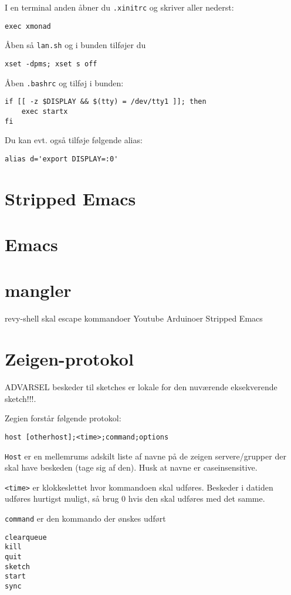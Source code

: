\documentclass[10pt,a4paper,danish]{article}
\begin{document}
I en terminal anden åbner du \texttt{.xinitrc} og skriver aller nederst:
\begin{verbatim}
exec xmonad
\end{verbatim}

Åben så \texttt{lan.sh} og i bunden tilføjer du
\begin{verbatim}
xset -dpms; xset s off
\end{verbatim}

Åben \texttt{.bashrc} og tilføj i bunden:
\begin{verbatim}
if [[ -z $DISPLAY && $(tty) = /dev/tty1 ]]; then
    exec startx
fi
\end{verbatim}
Du kan evt. også tilføje følgende alias:
\begin{verbatim}
alias d='export DISPLAY=:0'
\end{verbatim}

\section{Stripped Emacs}
\section{Emacs}
\section{mangler}
revy-shell skal escape kommandoer
Youtube
Arduinoer
Stripped Emacs

\section{Zeigen-protokol}

ADVARSEL beskeder til sketches er lokale for den nuværende eksekverende sketch!!!.

Zegien forstår følgende protokol:

\begin{verbatim}
host [otherhost];<time>;command;options
\end{verbatim}

\texttt{Host} er en mellemrums adskilt liste af navne på de zeigen servere/grupper der
skal have beskeden (tage sig af den). Husk at navne er caseinsensitive.

\texttt{<time>} er klokkeslettet hvor kommandoen skal udføres.
Beskeder i datiden udføres hurtigst muligt, så brug 0 hvis den skal udføres med
det samme.

\texttt{command} er den kommando der ønskes udført
\begin{verbatim}
clearqueue
kill
quit
sketch
start
sync
\end{verbatim}
\end{document}
